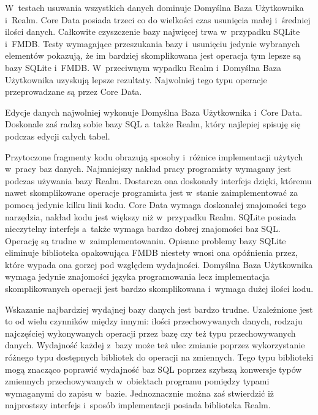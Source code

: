  W~testach usuwania wszystkich danych dominuje Domyślna Baza Użytkownika i~Realm. Core Data posiada trzeci co do wielkości czas usunięcia małej i~średniej ilości danych. Całkowite czyszczenie bazy najwięcej trwa w~przypadku SQLite i~FMDB.  Testy wymagające przeszukania bazy i~usunięciu jedynie wybranych elementów pokazują, że im bardziej skomplikowana jest operacja tym lepsze są bazy SQLite i~FMDB. W~przeciwnym wypadku Realm i~Domyślna Baza Użytkownika uzyskują lepsze rezultaty. Najwolniej tego typu operacje przeprowadzane są przez Core Data. 

Edycje danych najwolniej wykonuje Domyślna Baza Użytkownika i~Core Data. Doskonale zaś radzą sobie bazy SQL a~także Realm, który najlepiej spisuję się podczas edycji całych tabel. 

Przytoczone fragmenty kodu obrazują sposoby i~różnice implementacji użytych w~pracy baz danych. Najmniejszy nakład pracy programisty wymagany jest podczas używania bazy Realm. Dostarcza ona doskonały interfejs dzięki, któremu nawet skomplikowane operacje programista jest w~stanie zaimplementować za pomocą jedynie kilku linii kodu. Core Data wymaga doskonałej znajomości tego narzędzia, nakład kodu jest większy niż w~przypadku Realm. SQLite posiada nieczytelny interfejs a~także wymaga bardzo dobrej znajomości baz SQL. Operację są trudne w~zaimplementowaniu. Opisane problemy bazy SQLite eliminuje biblioteka opakowująca FMDB niestety wnosi ona opóźnienia przez, które wypada ona gorzej pod względem wydajności. Domyślna Baza Użytkownika wymaga jedynie znajomości języka programowania lecz implementacja skomplikowanych operacji jest bardzo skomplikowana i~wymaga dużej ilości kodu. 

Wskazanie najbardziej wydajnej bazy danych jest bardzo trudne. Uzależnione jest to od wielu czynników między innymi: ilości przechowywanych danych, rodzaju najczęściej wykonywanych operacji przez bazę czy też typu przechowywanych danych. Wydajność każdej z~bazy może też ulec zmianie poprzez wykorzystanie różnego typu dostępnych bibliotek do operacji na zmiennych. Tego typu biblioteki mogą znacząco poprawić wydajność baz SQL poprzez szybszą konwersje typów zmiennych przechowywanych w~obiektach programu pomiędzy typami wymaganymi do zapisu w~bazie. Jednoznacznie można zaś stwierdzić iż najprostszy interfejs i~sposób implementacji posiada biblioteka Realm.